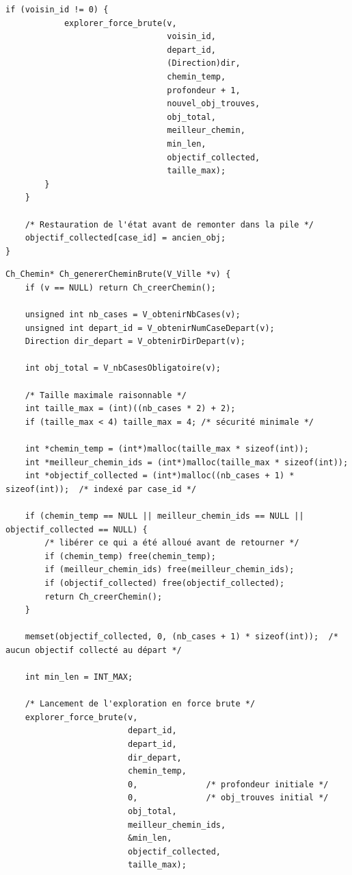 \begin{lstlisting}[caption={explorer\_force\_brute}]
        if (voisin_id != 0) {
            explorer_force_brute(v,
                                 voisin_id,
                                 depart_id,
                                 (Direction)dir,
                                 chemin_temp,
                                 profondeur + 1,
                                 nouvel_obj_trouves,
                                 obj_total,
                                 meilleur_chemin,
                                 min_len,
                                 objectif_collected,
                                 taille_max);
        }
    }

    /* Restauration de l'état avant de remonter dans la pile */
    objectif_collected[case_id] = ancien_obj;
}
\end{lstlisting}

\begin{lstlisting}[caption={Ch\_genererCheminBrute}]
Ch_Chemin* Ch_genererCheminBrute(V_Ville *v) {
    if (v == NULL) return Ch_creerChemin();

    unsigned int nb_cases = V_obtenirNbCases(v);
    unsigned int depart_id = V_obtenirNumCaseDepart(v);
    Direction dir_depart = V_obtenirDirDepart(v);

    int obj_total = V_nbCasesObligatoire(v);

    /* Taille maximale raisonnable */
    int taille_max = (int)((nb_cases * 2) + 2);
    if (taille_max < 4) taille_max = 4; /* sécurité minimale */

    int *chemin_temp = (int*)malloc(taille_max * sizeof(int));
    int *meilleur_chemin_ids = (int*)malloc(taille_max * sizeof(int));
    int *objectif_collected = (int*)malloc((nb_cases + 1) * sizeof(int));  /* indexé par case_id */

    if (chemin_temp == NULL || meilleur_chemin_ids == NULL || objectif_collected == NULL) {
        /* libérer ce qui a été alloué avant de retourner */
        if (chemin_temp) free(chemin_temp);
        if (meilleur_chemin_ids) free(meilleur_chemin_ids);
        if (objectif_collected) free(objectif_collected);
        return Ch_creerChemin();
    }

    memset(objectif_collected, 0, (nb_cases + 1) * sizeof(int));  /* aucun objectif collecté au départ */

    int min_len = INT_MAX;

    /* Lancement de l'exploration en force brute */
    explorer_force_brute(v,
                         depart_id,
                         depart_id,
                         dir_depart,
                         chemin_temp,
                         0,              /* profondeur initiale */
                         0,              /* obj_trouves initial */
                         obj_total,
                         meilleur_chemin_ids,
                         &min_len,
                         objectif_collected,
                         taille_max);


\end{lstlisting}
